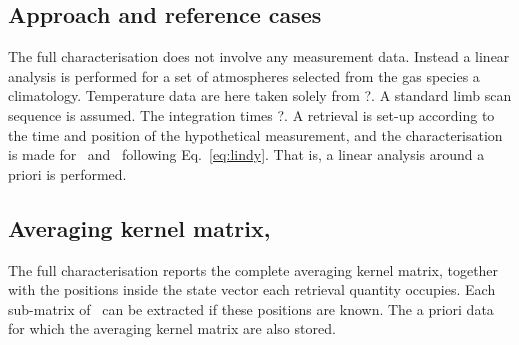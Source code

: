 \subsection{Approach and reference cases}
\label{sec:fullchar:select}
%
The full characterisation does not involve any measurement data. Instead a
linear analysis is performed for a set of atmospheres selected from the gas
species a climatology. Temperature data are here taken solely from
?. A standard limb scan sequence is assumed. The integration times
?. A retrieval is set-up according to the time and
position of the hypothetical measurement, and the characterisation is made for
\aWfnMtr{\SttVct}\ and \CtrFncMtr\ following Eq.~\ref{eq:lindy}. That is, a
linear analysis around a priori is performed.
\\


\subsection{Averaging kernel matrix, \AvrKrnMtr}
\label{sec:A}
%
The full characterisation reports the complete averaging kernel matrix,
together with the positions inside the state vector each retrieval quantity
occupies. Each sub-matrix of \AvrKrnMtr\ can be extracted if these positions
are known. The a priori data for which the averaging kernel matrix are also
stored. 
\\


